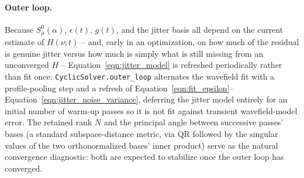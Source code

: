 \documentclass[manuscript]{aastex631}
\newcommand{\Eqn}[1]{Equation~\ref{eqn:#1}}
\begin{document}
\paragraph{Outer loop.} Because $S_\mu^0(\alpha)$, $\epsilon(t)$, $g(t)$,
and the jitter basis all depend on the current estimate of $H(\nu;t)$
-- and, early in an optimization, on how much of the residual is genuine
jitter versus how much is simply what is still missing from an
unconverged $H$ -- \Eqn{jitter_model} is refreshed periodically rather
than fit once: \texttt{CyclicSolver.outer\_loop} alternates the wavefield
fit with a profile-pooling step and a refresh of
\Eqn{fit_epsilon}--\Eqn{jitter_noise_variance}, deferring the jitter model
entirely for an initial number of warm-up passes so it is not fit against
transient wavefield-model error. The retained rank $N$ and the principal
angle between successive passes' bases (a standard subspace-distance
metric, via QR followed by the singular values of the two orthonormalized
bases' inner product) serve as the natural convergence diagnostic: both
are expected to stabilize once the outer loop has converged.














\end{document}
